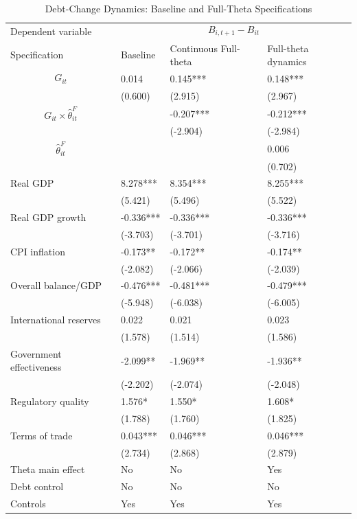 \begin{table}[H]\centering
\begin{threeparttable}
\caption{Debt-Change Dynamics: Baseline and Full-Theta Specifications}
\label{tab:debt_change_combined_fulltheta}
\scriptsize
\begin{tabularx}{\textwidth}{lYYY}
\toprule
Dependent variable &  \\
\cmidrule(lr){2-4}
Specification & Baseline & Continuous Full-theta & Full-theta dynamics \\
\midrule
$$G_{it}$$ & 0.014 & 0.145*** & 0.148*** \\
 & (0.600) & (2.915) & (2.967) \\
$$G_{it}\times\widehat{\theta}^{F}_{it}$$ &  & -0.207*** & -0.212*** \\
 &  & (-2.904) & (-2.984) \\
$$\widehat{\theta}^{F}_{it}$$ &  &  & 0.006 \\
 &  &  & (0.702) \\
Real GDP & 8.278*** & 8.354*** & 8.255*** \\
 & (5.421) & (5.496) & (5.522) \\
Real GDP growth & -0.336*** & -0.336*** & -0.336*** \\
 & (-3.703) & (-3.701) & (-3.716) \\
CPI inflation & -0.173** & -0.172** & -0.174** \\
 & (-2.082) & (-2.066) & (-2.039) \\
Overall balance/GDP & -0.476*** & -0.481*** & -0.479*** \\
 & (-5.948) & (-6.038) & (-6.005) \\
International reserves & 0.022 & 0.021 & 0.023 \\
 & (1.578) & (1.514) & (1.586) \\
Government effectiveness & -2.099** & -1.969** & -1.936** \\
 & (-2.202) & (-2.074) & (-2.048) \\
Regulatory quality & 1.576* & 1.550* & 1.608* \\
 & (1.788) & (1.760) & (1.825) \\
Terms of trade & 0.043*** & 0.046*** & 0.046*** \\
 & (2.734) & (2.868) & (2.879) \\
\midrule
Theta main effect & No & No & Yes \\
Debt control & No & No & No \\
Controls & Yes & Yes & Yes \\

\end{tabularx}
\end{threeparttable}
\end{table}
